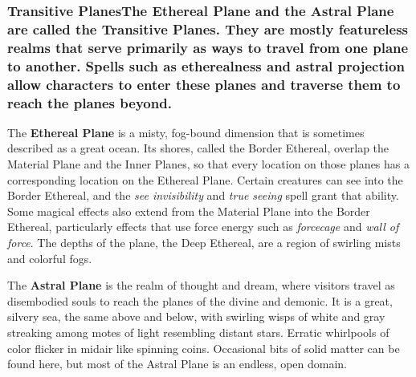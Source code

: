 \documentclass[
]{article}
\begin{document}
\hypertarget{transitive-planesthe-ethereal-plane-and-the-astral-plane-are-called-the-transitive-planes-they-are-mostly-featureless-realms-that-serve-primarily-as-ways-to-travel-from-one-plane-to-another-spells-such-as-etherealness-and-astral-projection-allow-characters-to-enter-these-planes-and-traverse-them-to-reach-the-planes-beyond}{%
\subsubsection{Transitive PlanesThe Ethereal Plane and the Astral Plane
are called the Transitive Planes. They are mostly featureless realms
that serve primarily as ways to travel from one plane to another. Spells
such as etherealness and astral projection allow characters to enter
these planes and traverse them to reach the planes
beyond.}\label{transitive-planesthe-ethereal-plane-and-the-astral-plane-are-called-the-transitive-planes-they-are-mostly-featureless-realms-that-serve-primarily-as-ways-to-travel-from-one-plane-to-another-spells-such-as-etherealness-and-astral-projection-allow-characters-to-enter-these-planes-and-traverse-them-to-reach-the-planes-beyond}}

The \textbf{Ethereal Plane} is a misty, fog-bound dimension that is
sometimes described as a great ocean. Its shores, called the Border
Ethereal, overlap the Material Plane and the Inner Planes, so that every
location on those planes has a corresponding location on the Ethereal
Plane. Certain creatures can see into the Border Ethereal, and the
\emph{see invisibility} and \emph{true seeing} spell grant that ability.
Some magical effects also extend from the Material Plane into the Border
Ethereal, particularly effects that use force energy such as
\emph{forcecage} and \emph{wall of force}. The depths of the plane, the
Deep Ethereal, are a region of swirling mists and colorful fogs.

The \textbf{Astral Plane} is the realm of thought and dream, where
visitors travel as disembodied souls to reach the planes of the divine
and demonic. It is a great, silvery sea, the same above and below, with
swirling wisps of white and gray streaking among motes of light
resembling distant stars. Erratic whirlpools of color flicker in midair
like spinning coins. Occasional bits of solid matter can be found here,
but most of the Astral Plane is an endless, open domain.
\end{document}
